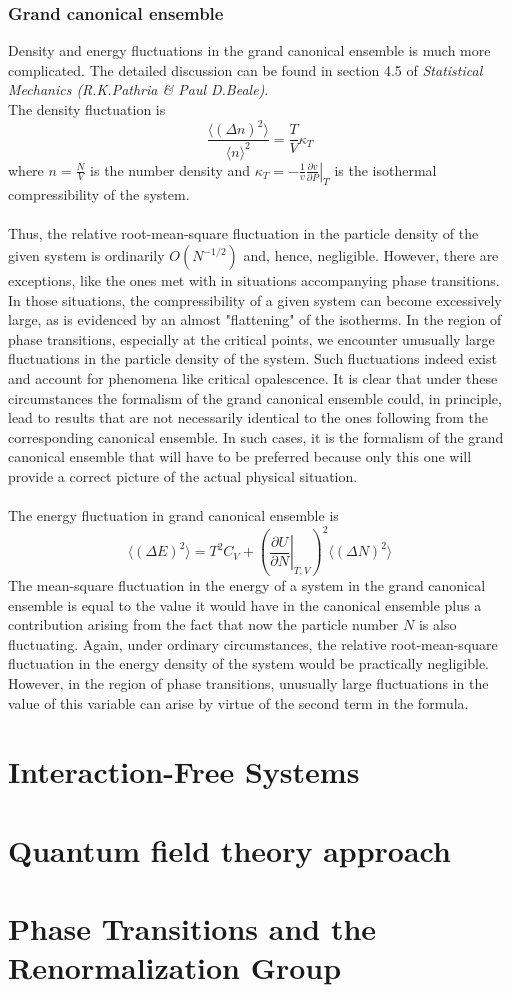 \subsection{Grand canonical ensemble}
Density and energy fluctuations in the grand canonical ensemble is much more complicated. The detailed discussion can be found in section 4.5 of \emph{Statistical Mechanics (R.K.Pathria \& Paul D.Beale)}. 
\\
The density fluctuation is
\[\frac{\langle (\Delta n)^2 \rangle}{\langle n \rangle^2} = \frac{T}{V}\kappa_T\]
where $ n = \frac{N}{V}$ is the number density and $\kappa_T = -\frac{1}{v} \left. \frac{\partial v}{\partial P} \right|_{T}$ is the isothermal compressibility of the system.
\\ \\
Thus, the relative root-mean-square fluctuation in the particle density of the given system is ordinarily $O(N^{-1/2})$ and, hence, negligible. However, there are exceptions, like the ones met with in situations accompanying phase transitions. In those situations, the compressibility of a given system can become excessively large, as is evidenced by an almost "flattening" of the isotherms. In the region of phase transitions, especially at the critical points, we encounter unusually large fluctuations in the particle density of the system. Such fluctuations indeed exist and account for phenomena like critical opalescence. It is clear that under these circumstances the formalism of the grand canonical ensemble could, in principle, lead to results that are not necessarily identical to the ones following from the corresponding canonical ensemble. In such cases, it is the formalism of the grand canonical ensemble that will have to be preferred because only this one will provide a correct picture of the actual physical situation.
\\ \\
The energy fluctuation in grand canonical ensemble is 
\[\langle (\Delta E)^2 \rangle = T^2C_V + \left(\left. \frac{\partial U}{\partial N} \right|_{T,V} \right)^2 \langle (\Delta N)^2 \rangle\]
The mean-square fluctuation in the energy of a system in the grand canonical ensemble is equal to the value it would have in the canonical ensemble plus a contribution arising from the fact that now the particle number $N$ is also fluctuating. Again, under ordinary circumstances, the relative root-mean-square fluctuation in the energy density of the system would be practically negligible. However, in the region of phase transitions, unusually large fluctuations in the value of this variable can arise by virtue of the second term in the formula.

\chapter{Interaction-­Free Systems}

\chapter{Quantum field theory approach}

\chapter{Phase Transitions and the Renormalization Group}
